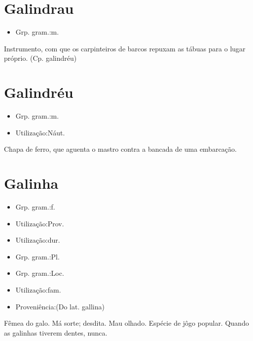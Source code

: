 \section{Galindrau}
\begin{itemize}
\item {Grp. gram.:m.}
\end{itemize}
Instrumento, com que os carpinteiros de barcos repuxam as tábuas para o lugar próprio.
(Cp. \textunderscore galindréu\textunderscore )
\section{Galindréu}
\begin{itemize}
\item {Grp. gram.:m.}
\end{itemize}
\begin{itemize}
\item {Utilização:Náut.}
\end{itemize}
Chapa de ferro, que aguenta o mastro contra a bancada de uma embarcação.
\section{Galinha}
\begin{itemize}
\item {Grp. gram.:f.}
\end{itemize}
\begin{itemize}
\item {Utilização:Prov.}
\end{itemize}
\begin{itemize}
\item {Utilização:dur.}
\end{itemize}
\begin{itemize}
\item {Grp. gram.:Pl.}
\end{itemize}
\begin{itemize}
\item {Grp. gram.:Loc.}
\end{itemize}
\begin{itemize}
\item {Utilização:fam.}
\end{itemize}
\begin{itemize}
\item {Proveniência:(Do lat. \textunderscore gallina\textunderscore )}
\end{itemize}
Fêmea do galo.
Má sorte; desdita.
Mau olhado.
Espécie de jôgo popular.
\textunderscore Quando as galinhas tiverem dentes\textunderscore , nunca.
